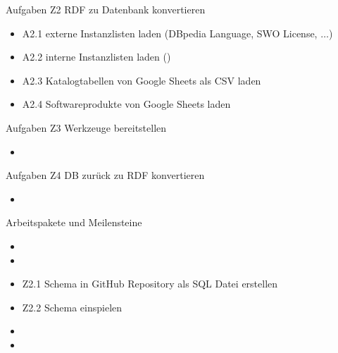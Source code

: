 \documentclass[aspectratio=169]{beamer}
\begin{document}
\begin{frame}{Aufgaben Z2 RDF zu Datenbank konvertieren}
\begin{itemize}
\item A2.1 externe Instanzlisten laden (DBpedia Language, SWO License, $\ldots$) \checkmark
\item A2.2 interne Instanzlisten laden () \checkmark
\item A2.3 Katalogtabellen von Google Sheets als CSV laden \checkmark
\item A2.4 Softwareprodukte von Google Sheets laden
\end{itemize}
\end{frame}

\begin{frame}{Aufgaben Z3 Werkzeuge bereitstellen}
\begin{itemize}
\item 
\end{itemize}
\end{frame}

\begin{frame}{Aufgaben Z4 DB zurück zu RDF konvertieren}
\begin{itemize}
\item 
\end{itemize}
\end{frame}


\begin{frame}{Arbeitspakete und Meilensteine}
\begin{itemize}
\item 
\item 
\item Z2.1 Schema in GitHub Repository als SQL Datei erstellen \checkmark
\item Z2.2 Schema einspielen  \checkmark
\item 
\item 
\end{itemize}
\end{frame}
\end{document}
